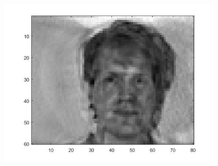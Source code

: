 \documentclass{article}
\begin{document}
\begin{figure}[H]


\end{figure}

\begin{figure}[H]

\includegraphics[scale =.5]{report8}
\end{figure}
\end{document}
